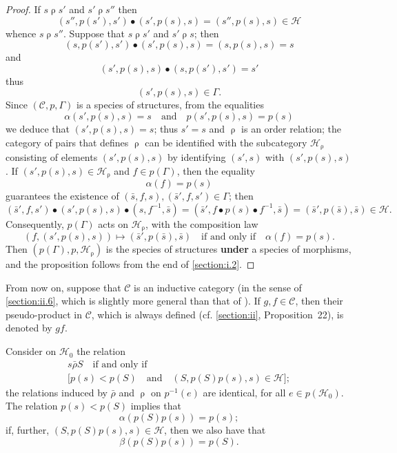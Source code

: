 \documentclass[fleqn]{article}
\newcommand{\oldpage}[1]{\marginpar{\footnotesize$\Big\vert$ \textit{p.~#1}}}
\newcommand{\unsure}[1]{{\color{purple}\textbf{#1}}}
\newcommand{\CC}{\mathcal{C}}
\newcommand{\HH}{\mathcal{H}}
\newcommand{\relrho}{\mathrel{\rho}}
\newcommand{\relrhobar}{\mathrel{\bar{\rho}}}
\begin{document}
\begin{proof}
  If $s\relrho s'$ and $s'\relrho s''$ then
  \[
    (s'',p(s'),s')\bullet(s',p(s),s)
    = (s'',p(s),s)
    \in\HH
  \]
  whence $s\relrho s''$.
  Suppose that $s\relrho s'$ and $s'\relrho s$;
  then
  \[
    (s,p(s'),s')\bullet(s',p(s),s)
    = (s,p(s),s)
    = s
  \]
  and
  \[
    (s',p(s),s)\bullet(s,p(s'),s')
    = s'
  \]
  thus
  \[
    (s',p(s),s)\in\Gamma.
  \]
  \oldpage{359}
  Since $(\CC,p,\Gamma)$ is a species of structures, from the equalities
  \[
    \alpha(s',p(s),s)=s
    \quad\text{and}\quad
    p(s',p(s),s)=p(s)
  \]
  we deduce that $(s',p(s),s)=s$;
  thus $s'=s$ and $\relrho$ is an order relation;
  the category of pairs that defines $\relrho$ can be identified with the subcategory $\HH_{\relrho}$ consisting of elements $(s',p(s),s)$ by identifying $(s',s)$ with $(s',p(s),s)$.
  If $(s',p(s),s)\in\HH_{\relrho}$ and $f\in p(\Gamma)$, then the equality
  \[
    \alpha(f)=p(s)
  \]
  guarantees the existence of $(\bar{s},f,s),(\bar{s}',f,s')\in\Gamma$;
  then
  \[
    (\bar{s}',f,s')\bullet(s',p(s),s)\bullet(s,f^{-1},\bar{s})
    = (\bar{s}',f\bullet p(s)\bullet f^{-1},\bar{s})
    = (\bar{s}',p(\bar{s}),\bar{s})
    \in\HH.
  \]
  Consequently, $p(\Gamma)$ acts on $\HH_{\relrho}$, with the composition law
  \[
    (f,(s',p(s),s))
    \longmapsto (\bar{s}',p(\bar{s}),\bar{s})
    \quad\text{if and only if}\quad
    \alpha(f)=p(s).
  \]
  Then $(p(\Gamma),p,\HH_{\relrho})$ is the species of structures \unsure{under} a species of morphisms, and the proposition follows from the end of \cref{section:i.2}.
\end{proof}

From now on, suppose that $\CC$ is an inductive category (in the sense of \cref{section:ii.6}, which is slightly more general than that of \cite{3c}).
If $g,f\in\CC$, then their pseudo-product in $\CC$, which is always defined (cf. \cref{section:ii}, Proposition~22), is denoted by $gf$.

Consider on $\HH_0$ the relation
\[
  \begin{gathered}
    s\relrhobar S
    \quad\text{if and only if}\quad
  \\\big[p(s)<p(S)
    \quad\text{and}\quad
    (S,p(S)p(s),s)\in\HH\big];
  \end{gathered}
\]
the relations induced by $\relrhobar$ and $\relrho$ on $p^{-1}(e)$ are identical, for all $e\in p(\HH_0)$.
The relation $p(s)<p(S)$ implies that
\[
  \alpha(p(S)p(s))
  = p(s);
\]
if, further, $(S,p(S)p(s),s)\in\HH$, then we also have that
\[
  \beta(p(S)p(s))
  = p(S).
\]
\end{document}
